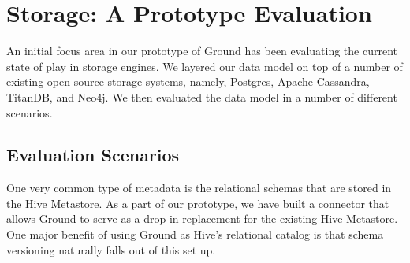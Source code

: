 \documentclass{sig-alternate}
\begin{document}

\smallitembot


\section{Storage: A Prototype Evaluation}
\label{sec:storage}

An initial focus area in our prototype of Ground has been evaluating the current state of play in storage engines. We layered our data model on top of a number of existing open-source storage systems, namely, Postgres, Apache Cassandra, TitanDB, and Neo4j. We then evaluated the data model in a number of different scenarios. 
\subsection{Evaluation Scenarios}

 One very common type of metadata is the relational schemas that are stored in the Hive Metastore. As a part of our prototype, we have built a connector that allows Ground to serve as a drop-in replacement for the existing Hive Metastore. One major benefit of using Ground as Hive's relational catalog is that schema versioning naturally falls out of this set up. 
\end{document}
